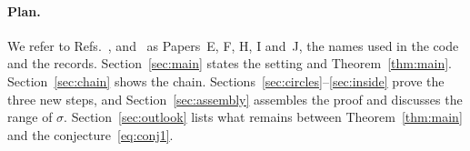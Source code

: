 \paragraph*{Plan.}
We refer to Refs.~\cite{E}, \cite{F} and~\cite{H,I,J} as Papers~E, F, H, I and~J, the names used in the code and the records.
Section~\ref{sec:main} states the setting and Theorem~\ref{thm:main}.
Section~\ref{sec:chain} shows the chain.
Sections~\ref{sec:circles}--\ref{sec:inside} prove the three new steps, and Section~\ref{sec:assembly} assembles the proof and discusses the range of $\sigma$.
Section~\ref{sec:outlook} lists what remains between Theorem~\ref{thm:main} and the conjecture~\eqref{eq:conj1}.
